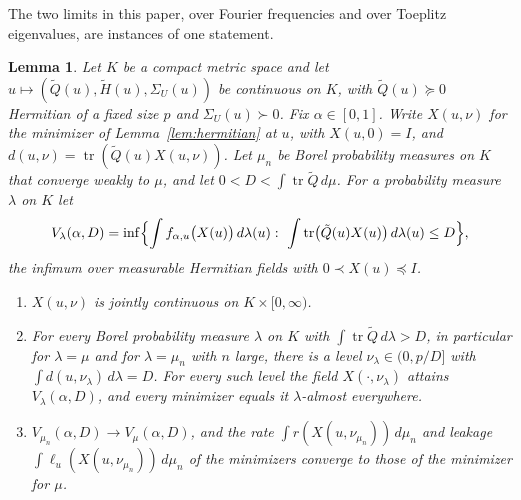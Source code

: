 \documentclass[11pt,onecolumn]{IEEEtran}
\newtheorem{lemma}[theorem]{Lemma}
\newcommand{\tr}{\operatorname{tr}}
\newcommand{\tQ}{\tilde Q}
\newcommand{\tH}{\tilde H}
\begin{document}
The two limits in this paper, over Fourier frequencies and over Toeplitz
eigenvalues, are instances of one statement.

\begin{lemma}\label{lem:limit}
Let $K$ be a compact metric space and let
$u\mapsto(\tQ(u),\tH(u),\Sigma_U(u))$ be continuous on $K$, with
$\tQ(u)\succeq0$ Hermitian of a fixed size $p$ and
$\Sigma_U(u)\succ0$. Fix $\alpha\in[0,1]$. Write $X(u,\nu)$ for the minimizer of
Lemma~\ref{lem:hermitian} at $u$, with $X(u,0)=I$, and
$d(u,\nu)=\tr(\tQ(u)X(u,\nu))$. Let $\mu_n$ be Borel probability
measures on $K$ that converge weakly to $\mu$, and let
$0<D<\int\tr\tQ\,d\mu$. For a probability measure $\lambda$ on $K$ let
\[
V_\lambda(\alpha,D)=\inf\Bigl\{\int f_{\alpha,u}\bigl(X(u)\bigr)\,d\lambda(u):\
\int\tr\bigl(\tQ(u)X(u)\bigr)\,d\lambda(u)\le D\Bigr\},
\]
the infimum over measurable Hermitian fields with $0\prec X(u)\preceq I$.
\begin{enumerate}
\item[(a)] $X(u,\nu)$ is jointly continuous on $K\times[0,\infty)$.
\item[(b)] For every Borel probability measure $\lambda$ on $K$ with
$\int\tr\tQ\,d\lambda>D$, in particular for $\lambda=\mu$ and for
$\lambda=\mu_n$ with $n$ large, there
is a level $\nu_\lambda\in(0,p/D]$ with $\int d(u,\nu_\lambda)\,d\lambda=D$.
For every such level the field $X(\cdot,\nu_\lambda)$ attains
$V_\lambda(\alpha,D)$, and every minimizer equals it
$\lambda$-almost everywhere.
\item[(c)] $V_{\mu_n}(\alpha,D)\to V_\mu(\alpha,D)$, and the rate
$\int r(X(u,\nu_{\mu_n}))\,d\mu_n$ and leakage
$\int\ell_u(X(u,\nu_{\mu_n}))\,d\mu_n$ of the minimizers converge to those
of the minimizer for $\mu$.
\end{enumerate}
\end{lemma}
\end{document}
